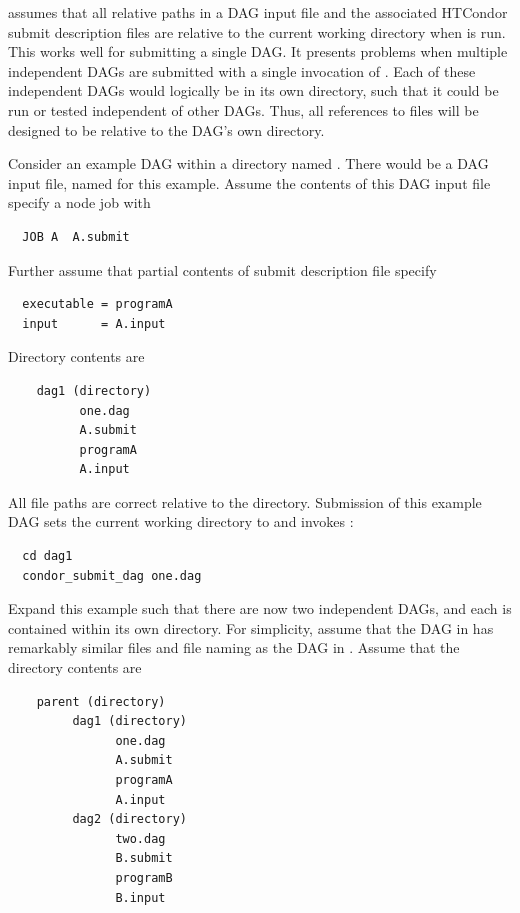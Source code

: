  assumes that all relative paths in a
DAG input file and the associated HTCondor submit description files
are relative to the current
working directory when  is run.  
This works well for submitting a single DAG.
It presents problems when multiple independent DAGs are submitted
with a single invocation of .
Each of these independent DAGs would logically be in its own directory, 
such that it could be run or tested independent of other DAGs.
Thus, all references to files will be designed to be relative to
the DAG's own directory.


Consider an example DAG within a directory named .
There would be a DAG input file, named  for this example.
Assume the contents of this DAG input file specify a node job with
\begin{verbatim}
  JOB A  A.submit
\end{verbatim}
Further assume that partial contents of submit description file 
 specify
\begin{verbatim}
  executable = programA
  input      = A.input
\end{verbatim}

Directory contents are 
\begin{verbatim}
    dag1 (directory)
          one.dag
          A.submit
          programA
          A.input
\end{verbatim}

All file paths are correct relative to the  directory.
Submission of this example DAG sets the current working directory
to  and invokes :
\begin{verbatim}
  cd dag1
  condor_submit_dag one.dag
\end{verbatim}

Expand this example such that there are now two independent DAGs,
and each is contained within its own directory. 
For simplicity, assume that the DAG in  has remarkably
similar files and file naming as the DAG in .
Assume that the directory contents are 
\begin{verbatim}
    parent (directory)
         dag1 (directory)
               one.dag
               A.submit
               programA
               A.input
         dag2 (directory)
               two.dag
               B.submit
               programB
               B.input
\end{verbatim}

